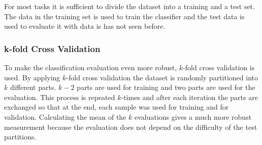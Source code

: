 For most tasks it is sufficient to divide the dataset into a training and a test set. The data in the training set is used to train the classifier and the test data is used to evaluate it with data is has not seen before.

\subsubsection*{k-fold Cross Validation}
To make the classification evaluation even more robust, $k$-fold cross validation is used. By applying $k$-fold cross validation the dataset is randomly partitioned into $k$ different parts. $k-2$ parts are used for training and two parts are used for the evaluation. This process is repeated $k$-times and after each iteration the parts are exchanged so that at the end, each sample was used for training and for validation. Calculating the mean of the $k$ evaluations gives a much more robust measurement because the evaluation does not depend on the difficulty of the test partitions.

